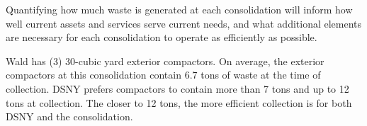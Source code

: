
    Quantifying how much waste is generated at each consolidation will inform how well current assets and services serve current needs, and what additional elements are necessary for each consolidation to operate as efficiently as possible.
    
    Wald has (3) 30-cubic yard exterior compactors. On average, the exterior compactors at this consolidation contain 6.7 tons of waste at the time of collection. DSNY prefers compactors to contain more than 7 tons and up to 12 tons at collection. The closer to 12 tons, the more efficient collection is for both DSNY and the consolidation.
